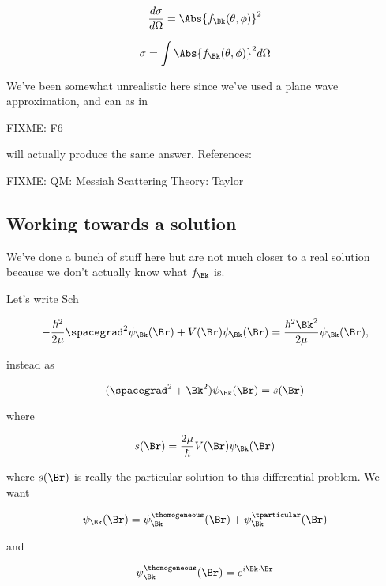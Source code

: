 \begin{equation}\label{eqn:qmTwoL24:n}
\frac{d\sigma}{d\Omega}
=
\Abs{f_\Bk(\theta, \phi)}^2
\end{equation}

\begin{equation}\label{eqn:qmTwoL24:n}
\sigma = \int \Abs{f_\Bk(\theta, \phi)}^2 d\Omega
\end{equation}

We've been somewhat unrealistic here since we've used a plane wave approximation, and can as in

FIXME: F6

will actually produce the same answer.  References:

FIXME:
QM: Messiah
Scattering Theory: Taylor

\subsection{Working towards a solution}

We've done a bunch of stuff here but are not much closer to a real solution because we don't actually know what $f_\Bk$ is.  

Let's write Sch

\begin{equation}\label{eqn:qmTwoL24:n}
-\frac{\hbar^2}{2\mu} \spacegrad^2 
\psi_\Bk(\Br)
+ V(\Br)
\psi_\Bk(\Br)
= 
\frac{\hbar^2 \Bk^2}{2 \mu}
\psi_\Bk(\Br),
\end{equation}

instead as

\begin{equation}\label{eqn:qmTwoL24:n}
(\spacegrad^2 + \Bk^2) 
\psi_\Bk(\Br)
= s(\Br)
\end{equation}

where 

\begin{equation}\label{eqn:qmTwoL24:n}
s(\Br) = \frac{2\mu}{\hbar} V(\Br) \psi_\Bk(\Br)
\end{equation}

where $s(\Br)$ is really the particular solution to this differential problem.   We want

\begin{equation}\label{eqn:qmTwoL24:n}
\psi_\Bk(\Br) = 
\psi_\Bk^\thomogeneous(\Br)
+ \psi_\Bk^\tparticular(\Br)
\end{equation}

and

\begin{equation}\label{eqn:qmTwoL24:n}
\psi_\Bk^\thomogeneous(\Br) = e^{i \Bk \cdot \Br}
\end{equation}

\EndArticle
